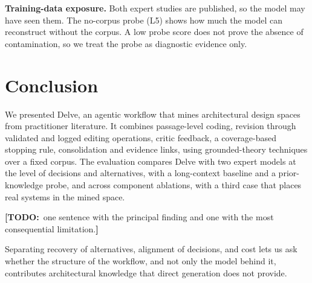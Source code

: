 \documentclass[conference]{IEEEtran}
\newcommand{\todo}[1]{{\color{red}\textbf{[TODO:}~#1\textbf{]}}}
\begin{document}
\textbf{Training-data exposure.} Both expert studies are published, so the model may have seen them. The no-corpus probe (L5) shows how much the model can reconstruct without the corpus. A low probe score does not prove the absence of contamination, so we treat the probe as diagnostic evidence only.

\section{Conclusion}

We presented Delve, an agentic workflow that mines architectural design spaces from practitioner literature. It combines passage-level coding, revision through validated and logged editing operations, critic feedback, a coverage-based stopping rule, consolidation and evidence links, using grounded-theory techniques over a fixed corpus. The evaluation compares Delve with two expert models at the level of decisions and alternatives, with a long-context baseline and a prior-knowledge probe, and across component ablations, with a third case that places real systems in the mined space.

\todo{one sentence with the principal finding and one with the most consequential limitation.}

Separating recovery of alternatives, alignment of decisions, and cost lets us ask whether the structure of the workflow, and not only the model behind it, contributes architectural knowledge that direct generation does not provide.



\end{document}
